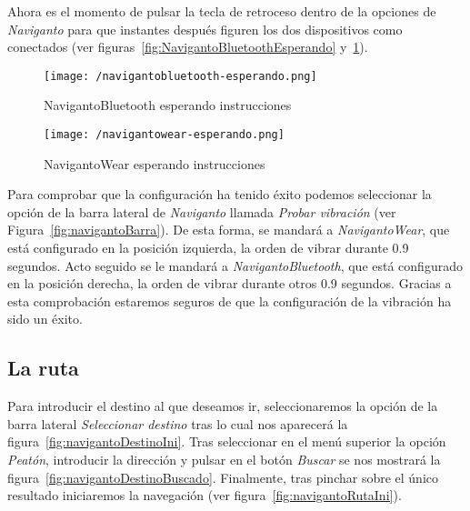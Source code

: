 Ahora es el momento de pulsar la tecla de retroceso dentro de la opciones de \emph{Naviganto} para
que instantes después figuren los dos dispositivos como conectados (ver
figuras~\ref{fig:NavigantoBluetoothEsperando} y~\ref{fig:NavigantowearEsperando}).

\begin{figure}[!h]
  \begin{minipage}[b]{0.5\linewidth}
    \begin{center}
      \texttt{[image: /navigantobluetooth-esperando.png]}
      \caption{NavigantoBluetooth esperando instrucciones}
      \label{fig:NavigantoBluetoothEsperando}
    \end{center}
  \end{minipage}
  \begin{minipage}[b]{0.5\linewidth}
    \begin{center}
      \texttt{[image: /navigantowear-esperando.png]}
      \caption{NavigantoWear esperando instrucciones}
      \label{fig:NavigantowearEsperando}
    \end{center}
  \end{minipage}
\end{figure}

Para comprobar que la configuración ha tenido éxito podemos seleccionar la opción de la barra
lateral de \emph{Naviganto} llamada \emph{Probar vibración} (ver
Figura~\ref{fig:navigantoBarra}). De esta forma, se mandará a \emph{NavigantoWear}, que está
configurado en la posición izquierda, la orden de vibrar durante 0.9 segundos. Acto seguido se le
mandará a \emph{NavigantoBluetooth}, que está configurado en la posición derecha, la orden de vibrar
durante otros 0.9 segundos. Gracias a esta comprobación estaremos seguros de que la configuración de
la vibración ha sido un éxito.

\subsection{La ruta}

Para introducir el destino al que deseamos ir, seleccionaremos la opción de la barra lateral
\emph{Seleccionar destino} tras lo cual nos aparecerá la figura~\ref{fig:navigantoDestinoIni}. Tras
seleccionar en el menú superior la opción \emph{Peatón}, introducir la dirección y pulsar en el
botón \emph{Buscar} se nos mostrará la figura~\ref{fig:navigantoDestinoBuscado}. Finalmente, tras
pinchar sobre el único resultado iniciaremos la navegación (ver figura~\ref{fig:navigantoRutaIni}).

